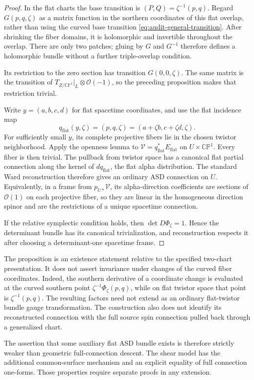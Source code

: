\begin{proof}
In the flat charts the base transition is
$(P,Q)=\zeta^{-1}(p,q)$. Regard $G(p,q,\zeta)$ as a matrix function in
the northern coordinates of this flat overlap, rather than using the
curved base transition \eqref{eq:audit-general-transition}. After
shrinking the fiber domains, it is holomorphic and invertible throughout
the overlap. There are only two patches; gluing by $G$ and $G^{-1}$
therefore defines a holomorphic bundle without a further triple-overlap
condition.

Its restriction to the zero section has transition $G(0,0,\zeta)$.
The same matrix is the transition of
$T_{Z/\mathbb{CP}^1}|_L\otimes\mathcal O(-1)$, so the preceding
proposition makes that restriction trivial.

Write $y=(a,b,c,d)$ for flat spacetime coordinates, and use the flat
incidence map
\[
q_{\mathrm{flat}}(y,\zeta)
=(p,q,\zeta)=(a+\zeta b,c+\zeta d,\zeta).
\]
For sufficiently small $y$, its complete projective fibers lie in the
chosen twistor neighborhood. Apply the openness lemma to
$\mathcal V=q_{\mathrm{flat}}^*E_{\mathrm{flat}}$ on
$U\times\mathbb{CP}^1$. Every fiber is then trivial. The pullback from
twistor space has a canonical flat partial connection along the kernel
of $dq_{\mathrm{flat}}$, the flat alpha distribution. The standard
Ward reconstruction therefore gives an ordinary ASD connection on $U$.
Equivalently, in a frame from $p_{U*}\mathcal V$, its alpha-direction
coefficients are sections of $\mathcal O(1)$ on each projective fiber,
so they are linear in the homogeneous direction spinor and are the
restrictions of a unique spacetime connection.

If the relative symplectic condition holds, then
$\det D\Phi_\zeta=1$. Hence the determinant bundle has its canonical
trivialization, and reconstruction respects it after choosing a
determinant-one spacetime frame.
\end{proof}

\begin{remark}
The proposition is an existence statement relative to the specified
two-chart presentation. It does not assert invariance under changes of
the curved fiber coordinates. Indeed, the southern derivative of a
coordinate change is evaluated at the curved southern point
$\zeta^{-1}\Phi_\zeta(p,q)$, while on flat twistor space that point is
$\zeta^{-1}(p,q)$. The resulting factors need not extend as an ordinary
flat-twistor bundle gauge transformation. The construction also does not
identify its reconstructed connection with the full source spin
connection pulled back through a generalized chart.

The assertion that some auxiliary flat ASD bundle exists is therefore
strictly weaker than geometric full-connection descent. The shear model
has the additional common-surface mechanism and an explicit equality of
full connection one-forms. Those properties require separate proofs in
any extension.
\end{remark}

